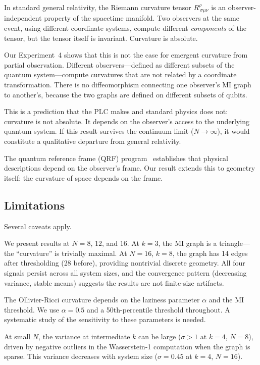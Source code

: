 \documentclass[aps,pra,twocolumn,superscriptaddress]{revtex4-2}
\begin{document}
In standard general relativity, the Riemann curvature tensor $R^\rho_{\ \sigma\mu\nu}$ is an observer-independent property of the spacetime manifold. Two observers at the same event, using different coordinate systems, compute different \emph{components} of the tensor, but the tensor itself is invariant. Curvature is absolute.

Our Experiment~4 shows that this is not the case for emergent curvature from partial observation. Different observers---defined as different subsets of the quantum system---compute curvatures that are not related by a coordinate transformation. There is no diffeomorphism connecting one observer's MI graph to another's, because the two graphs are defined on different subsets of qubits.

This is a prediction that the PLC makes and standard physics does not: curvature is not absolute. It depends on the observer's access to the underlying quantum system. If this result survives the continuum limit ($N \to \infty$), it would constitute a qualitative departure from general relativity.

The quantum reference frame (QRF) program~\cite{giacomini2019,vanrietvelde2020,muller2023} establishes that physical descriptions depend on the observer's frame. Our result extends this to geometry itself: the curvature of space depends on the frame.


\subsection{Limitations}

Several caveats apply.

We present results at $N = 8$, $12$, and $16$. At $k = 3$, the MI graph is a triangle---the ``curvature'' is trivially maximal. At $N = 16$, $k = 8$, the graph has 14 edges after thresholding (28 before), providing nontrivial discrete geometry. All four signals persist across all system sizes, and the convergence pattern (decreasing variance, stable means) suggests the results are not finite-size artifacts.

The Ollivier-Ricci curvature depends on the laziness parameter $\alpha$ and the MI threshold. We use $\alpha = 0.5$ and a 50th-percentile threshold throughout. A systematic study of the sensitivity to these parameters is needed.

At small $N$, the variance at intermediate $k$ can be large ($\sigma > 1$ at $k = 4$, $N = 8$), driven by negative outliers in the Wasserstein-1 computation when the graph is sparse. This variance decreases with system size ($\sigma = 0.45$ at $k = 4$, $N = 16$).
\end{document}
